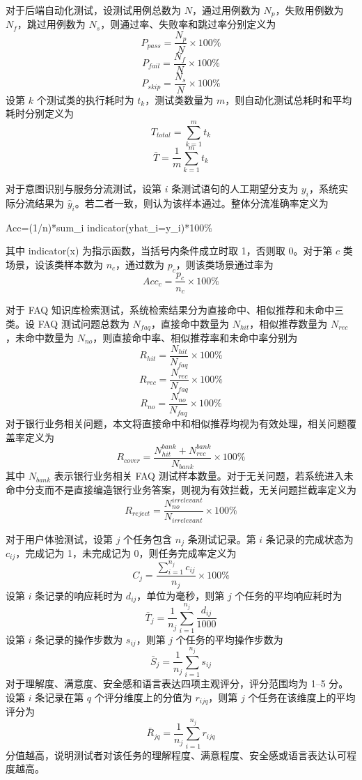 \documentclass[bachelor, print]{xduthesis}
\begin{document}
对于后端自动化测试，设测试用例总数为 \(N\)，通过用例数为 \(N_p\)，失败用例数为 \(N_f\)，跳过用例数为 \(N_s\)，则通过率、失败率和跳过率分别定义为
\[
P_{pass}=\frac{N_p}{N}\times 100\%
\]
\[
P_{fail}=\frac{N_f}{N}\times 100\%
\]
\[
P_{skip}=\frac{N_s}{N}\times 100\%
\]
设第 \(k\) 个测试类的执行耗时为 \(t_k\)，测试类数量为 \(m\)，则自动化测试总耗时和平均耗时分别定义为
\[
T_{total}=\sum_{k=1}^{m}t_k
\]
\[
\bar{T}=\frac{1}{m}\sum_{k=1}^{m}t_k
\]

对于意图识别与服务分流测试，设第 \(i\) 条测试语句的人工期望分支为 \(y_i\)，系统实际分流结果为 \(\hat{y}_i\)。若二者一致，则认为该样本通过。整体分流准确率定义为
\begin{center}
\textrm{Acc=(1/n)*sum\_i indicator(yhat\_i=y\_i)*100\%}
\end{center}
其中 indicator(x) 为指示函数，当括号内条件成立时取 1，否则取 0。对于第 \(c\) 类场景，设该类样本数为 \(n_c\)，通过数为 \(p_c\)，则该类场景通过率为
\[
Acc_c=\frac{p_c}{n_c}\times 100\%
\]

对于 FAQ 知识库检索测试，系统检索结果分为直接命中、相似推荐和未命中三类。设 FAQ 测试问题总数为 \(N_{faq}\)，直接命中数量为 \(N_{hit}\)，相似推荐数量为 \(N_{rec}\)，未命中数量为 \(N_{no}\)，则直接命中率、相似推荐率和未命中率分别为
\[
R_{hit}=\frac{N_{hit}}{N_{faq}}\times 100\%
\]
\[
R_{rec}=\frac{N_{rec}}{N_{faq}}\times 100\%
\]
\[
R_{no}=\frac{N_{no}}{N_{faq}}\times 100\%
\]
对于银行业务相关问题，本文将直接命中和相似推荐均视为有效处理，相关问题覆盖率定义为
\[
R_{cover}=\frac{N_{hit}^{bank}+N_{rec}^{bank}}{N_{bank}}\times 100\%
\]
其中 \(N_{bank}\) 表示银行业务相关 FAQ 测试样本数量。对于无关问题，若系统进入未命中分支而不是直接编造银行业务答案，则视为有效拦截，无关问题拦截率定义为
\[
R_{reject}=\frac{N_{no}^{irrelevant}}{N_{irrelevant}}\times 100\%
\]

对于用户体验测试，设第 \(j\) 个任务包含 \(n_j\) 条测试记录。第 \(i\) 条记录的完成状态为 \(c_{ij}\)，完成记为 1，未完成记为 0，则任务完成率定义为
\[
C_j=\frac{\sum_{i=1}^{n_j}c_{ij}}{n_j}\times 100\%
\]
设第 \(i\) 条记录的响应耗时为 \(d_{ij}\)，单位为毫秒，则第 \(j\) 个任务的平均响应耗时为
\[
\bar{T}_j=\frac{1}{n_j}\sum_{i=1}^{n_j}\frac{d_{ij}}{1000}
\]
设第 \(i\) 条记录的操作步数为 \(s_{ij}\)，则第 \(j\) 个任务的平均操作步数为
\[
\bar{S}_j=\frac{1}{n_j}\sum_{i=1}^{n_j}s_{ij}
\]
对于理解度、满意度、安全感和语言表达四项主观评分，评分范围均为 1--5 分。设第 \(i\) 条记录在第 \(q\) 个评分维度上的分值为 \(r_{ijq}\)，则第 \(j\) 个任务在该维度上的平均评分为
\[
\bar{R}_{jq}=\frac{1}{n_j}\sum_{i=1}^{n_j}r_{ijq}
\]
分值越高，说明测试者对该任务的理解程度、满意程度、安全感或语言表达认可程度越高。
\end{document}
